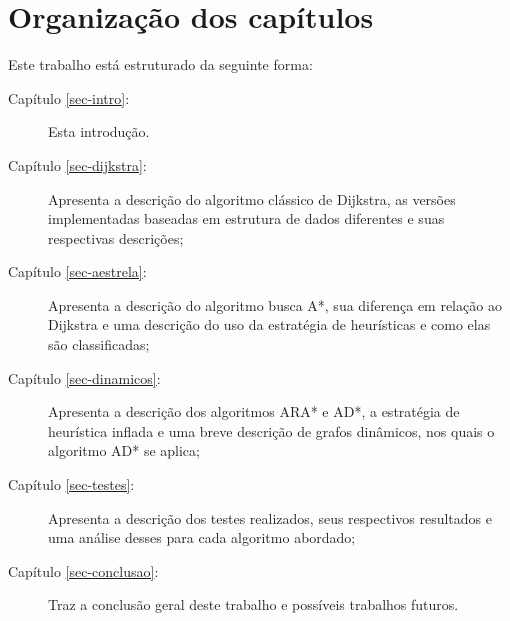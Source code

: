 \section{Organização dos capítulos}
\label{sec-intro-organizaocao}
Este trabalho está estruturado da seguinte forma:
\begin{description}
\item[Capítulo \ref{sec-intro}:] Esta introdução.
\item[Capítulo \ref{sec-dijkstra}:] Apresenta a descrição do algoritmo clássico de Dijkstra, as versões implementadas baseadas em estrutura de dados diferentes e suas respectivas descrições;
\item[Capítulo \ref{sec-aestrela}:] Apresenta a descrição do algoritmo busca A*, sua diferença em relação ao Dijkstra e uma descrição do uso da estratégia de heurísticas e como elas são classificadas;
\item[Capítulo \ref{sec-dinamicos}:] Apresenta a descrição dos algoritmos ARA* e AD*, a estratégia de heurística inflada e uma breve descrição de grafos dinâmicos, nos quais o algoritmo AD* se aplica;
\item[Capítulo \ref{sec-testes}:] Apresenta a descrição dos testes realizados, seus respectivos resultados e uma análise desses para cada algoritmo abordado;
\item[Capítulo \ref{sec-conclusao}:] Traz a conclusão geral deste trabalho e possíveis trabalhos futuros.
\end{description}